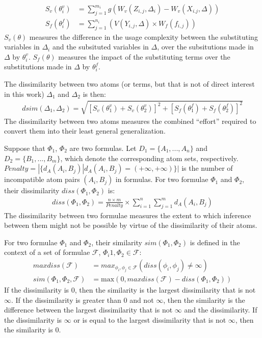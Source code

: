 \documentclass[EPiC]{easychair}
\begin{document}
\begin{align}
S_v(\theta_i^v) &= \sum_{j=1}^{m_i} g(W_v(Z_{i,j},\Delta_i) - W_v(X_{i.j},\Delta)) \\
S_f(\theta_i^f) &= \sum_{j=1}^{n_i} (V(Y_{i,j},\Delta) \times W_f(f_{i,j}))
\end{align}
$S_v(\theta)$ measures the difference in the usage complexity between
the substituting variables in $\Delta_i$ and the subsituted variables 
in $\Delta$, over the subsitutions made in $\Delta$ by $\theta_i^v$.
$S_f(\theta)$ measures the impact of the substituting terms over the 
substitutions made in $\Delta$ by $\theta_i^f$.

The dissimilarity between two atoms (or terms, but that is not of direct
interest in this work) $\Delta_1$ and $\Delta_2$ is then:
\begin{align}
dsim(\Delta_1,\Delta_2) = \sqrt{[S_v(\theta_1^v)+S_v(\theta_2^v)]^2+[S_f(\theta_1^f)+S_f(\theta_2^f)]^2}
\end{align}
The dissimilarity between two atoms measures the combined ``effort'' 
required to convert them into their least general generalization.

Suppose that $\Phi_1$, $\Phi_2$ are two formulas. 
Let $D_1=\{A_1, ..., A_n\}$ and $D_2=\{B_1, ..., B_m\}$, which denote the 
corresponding atom sets, respectively. 
$Penalty=|\{d_A(A_i,B_j) | d_A(A_i,B_j)=(+\infty, +\infty)\}|$ is the number 
of incompatible atom pairs $(A_i,B_j)$ in formulas. 
For two formulae $\Phi_1$ and $\Phi_2$, their dissimilarity 
$diss(\Phi_1,\Phi_2)$ is:
\begin{align}
diss(\Phi_1,\Phi_2) = \frac{n\times m}{Penalty}\times \sum_{i=1}^n \sum_{j=1}^{m}d_A(A_i, B_j)
\end{align}
The dissimilarity between two formulae measures the extent to which
inference between them might not be possible by virtue of the dissimilarity
of their atoms.

For two formulae $\Phi_1$ and $\Phi_2$, their similarity $sim(\Phi_1,\Phi_2)$
is defined in the context of a set of formulae $\mathcal{F}$, 
$\Phi_i1,\Phi_2 \in \mathcal{F}$:
\begin{align}
maxdiss(\mathcal{F}) &= max_{\phi_i,\phi_j \in \mathcal{F}} (diss(\phi_i,\phi_j) \neq \infty) \\
sim(\Phi_1,\Phi_2,\mathcal{F}) &= \textrm{max}(0, maxdiss(\mathcal{F}) - diss(\Phi_1,\Phi_2))
\end{align}
If the dissimilarity is $0$, then the similarity is the largest dissimilarity 
that is not $\infty$.
If the dissimilarity is greater than $0$ and not $\infty$, then the similarity 
is the difference between the largest dissimilarity that is not $\infty$ and 
the dissimilarity.
If the dissimilarity is $\infty$ or is equal to the largest 
dissimilarity that is not $\infty$, then the similarity is $0$.
\end{document}
